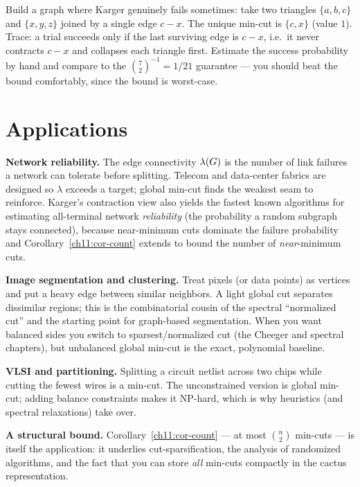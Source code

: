 \begin{labbox}
Build a graph where Karger genuinely fails sometimes: take two triangles $\{a,b,c\}$ and $\{x,y,z\}$ joined by a single edge $c{-}x$. The unique min-cut is $\{c,x\}$ (value $1$). Trace: a trial succeeds only if the last surviving edge is $c{-}x$, i.e.\ it never contracts $c{-}x$ and collapses each triangle first. Estimate the success probability by hand and compare to the $\binom72^{-1}=1/21$ guarantee --- you should beat the bound comfortably, since the bound is worst-case.
\end{labbox}

\section{Applications}

\begin{applicationbox}
\textbf{Network reliability.} The edge connectivity $\lambda(G)$ is the number of link failures a network can tolerate before splitting. Telecom and data-center fabrics are designed so $\lambda$ exceeds a target; global min-cut finds the weakest seam to reinforce. Karger's contraction view also yields the fastest known algorithms for estimating all-terminal network \emph{reliability} (the probability a random subgraph stays connected), because near-minimum cuts dominate the failure probability and Corollary~\ref{ch11:cor-count} extends to bound the number of \emph{near}-minimum cuts.

\textbf{Image segmentation and clustering.} Treat pixels (or data points) as vertices and put a heavy edge between similar neighbors. A light global cut separates dissimilar regions; this is the combinatorial cousin of the spectral ``normalized cut'' and the starting point for graph-based segmentation. When you want balanced sides you switch to sparsest/normalized cut (the Cheeger and spectral chapters), but unbalanced global min-cut is the exact, polynomial baseline.

\textbf{VLSI and partitioning.} Splitting a circuit netlist across two chips while cutting the fewest wires is a min-cut. The unconstrained version is global min-cut; adding balance constraints makes it NP-hard, which is why heuristics (and spectral relaxations) take over.

\textbf{A structural bound.} Corollary~\ref{ch11:cor-count} --- at most $\binom n2$ min-cuts --- is itself the application: it underlies cut-sparsification, the analysis of randomized algorithms, and the fact that you can store \emph{all} min-cuts compactly in the cactus representation.
\end{applicationbox}

